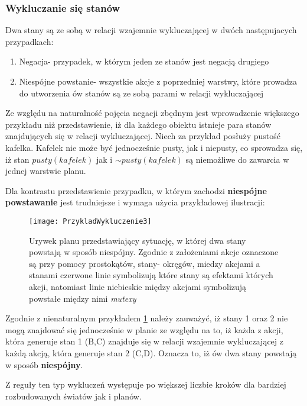     \subsubsection{Wykluczanie się stanów}
    Dwa stany są ze sobą w relacji wzajemnie wykluczającej w dwóch następujacych przypadkach:
    \begin{enumerate}
        \item Negacja- przypadek, w którym jeden ze stanów jest negacją drugiego
        \item Niespójne powstanie- wszystkie akcje z poprzedniej warstwy, które prowadza 
        do utworzenia ów stanów są ze sobą parami w relacji wykluczającej
    \end{enumerate}
    Ze względu na naturalność pojęcia negacji zbędnym jest wprowadzenie większego przykładu niż przedstawienie, iż dla każdego obiektu istnieje 
    para stanów znajdujących się w relacji wykluczającej. Niech za przykład posłuży pustość kafelka. Kafelek nie może być jednocześnie pusty, jak 
    i niepusty, co sprowadza się, iż stan $pusty(kafelek)$ jak i $\sim pusty(kafelek)$ są niemożliwe do zawarcia w jednej warstwie planu.

    Dla kontrastu przedstawienie przypadku, w którym zachodzi \textbf{niespójne powstawanie} jest trudniejsze i wymaga użycia 
    przykładowej ilustracji:

    \begin{figure}[H]
        \texttt{[image: PrzykladWykluczenie3]}
        \centering
        \caption{Urywek planu przedstawiający sytuację, w której dwa stany powstają w sposób niespójny. Zgodnie z założeniami akcje oznaczone są przy 
        pomocy prostokątów, stany- okręgów, miedzy akcjami a stanami czerwone linie symbolizują które stany są efektami których akcji, natomiast linie
        niebieskie między akcjami symbolizują powstałe między nimi \textit{mutexy}}
        \label{PrzykladWykluczenie3}
    \end{figure}

    Zgodnie z nienaturalnym przykładem \ref{PrzykladWykluczenie3} należy zauważyć, iż stany 1 oraz 2 nie mogą 
    znajdować się jednocześnie w planie ze względu na to, iż każda z akcji, która generuje stan 1 (B,C) znajduje się w relacji 
    wzajemnie wykluczającej z każdą akcją, która generuje stan 2 (C,D). Oznacza to, iż ów dwa stany powstają w sposób \textbf{niespójny}.
    
    Z reguły ten typ wykluczeń występuje po większej liczbie kroków dla bardziej rozbudowanych światów jak i planów.
    


